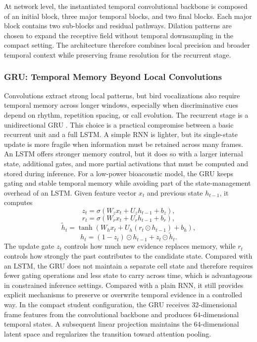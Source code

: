 \documentclass[a4paper,singleside,12pt]{report} %
\begin{document}
		\begin{sloppypar}
		At network level, the instantiated temporal convolutional backbone is composed of an initial block, three major temporal blocks, and two final blocks. Each major block contains two sub-blocks and residual pathways. Dilation patterns are chosen to expand the receptive field without temporal downsampling in the compact setting. The architecture therefore combines local precision and broader temporal context while preserving frame resolution for the recurrent stage.
		\end{sloppypar}

	\subsubsection{GRU: Temporal Memory Beyond Local Convolutions}
	Convolutions extract strong local patterns, but bird vocalizations also require temporal memory across longer windows, especially when discriminative cues depend on rhythm, repetition spacing, or call evolution. The recurrent stage is a unidirectional GRU \cite{cho2014gru}. This choice is a practical compromise between a basic recurrent unit and a full LSTM. A simple RNN is lighter, but its single-state update is more fragile when information must be retained across many frames. An LSTM offers stronger memory control, but it does so with a larger internal state, additional gates, and more partial activations that must be computed and stored during inference. For a low-power bioacoustic model, the GRU keeps gating and stable temporal memory while avoiding part of the state-management overhead of an LSTM. Given feature vector \(x_t\) and previous state \(h_{t-1}\), it computes
	\begin{equation}
		z_t=\sigma(W_z x_t + U_z h_{t-1} + b_z),
	\end{equation}
	\begin{equation}
		r_t=\sigma(W_r x_t + U_r h_{t-1} + b_r),
	\end{equation}
	\begin{equation}
		\tilde{h}_t=\tanh(W_h x_t + U_h(r_t \odot h_{t-1}) + b_h),
	\end{equation}
	\begin{equation}
		h_t=(1-z_t)\odot h_{t-1} + z_t \odot \tilde{h}_t.
	\end{equation}
	The update gate \(z_t\) controls how much new evidence replaces memory, while \(r_t\) controls how strongly the past contributes to the candidate state. Compared with an LSTM, the GRU does not maintain a separate cell state and therefore requires fewer gating operations and less state to carry across time, which is advantageous in constrained inference settings. Compared with a plain RNN, it still provides explicit mechanisms to preserve or overwrite temporal evidence in a controlled way. In the compact student configuration, the GRU receives \(32\)-dimensional frame features from the convolutional backbone and produces \(64\)-dimensional temporal states. A subsequent linear projection maintains the \(64\)-dimensional latent space and regularizes the transition toward attention pooling.
\end{document}
